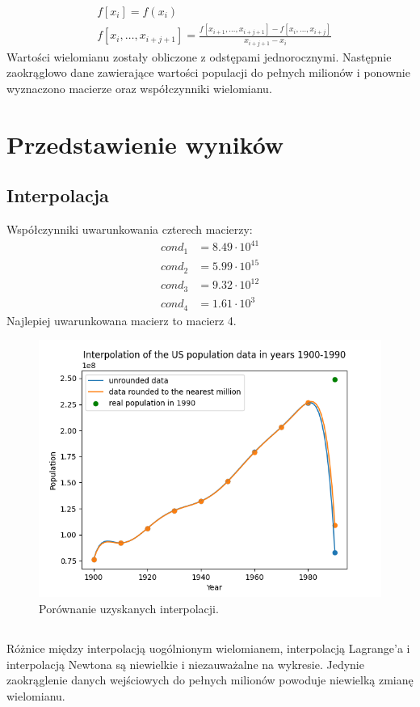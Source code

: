 \documentclass[11pt]{scrartcl}
\begin{document}
    \begin{align*}
        & f[x_i] = f(x_i) \\
        & f[x_i, \ldots ,x_{i+j+1}] =
        \frac{f[x_{i+1}, \ldots ,x_{i+j+1}]-f[x_i, \ldots ,x_{i+j}]}{x_{i+j+1}-x_i}
    \end{align*}
    Wartości wielomianu zostały obliczone z odstępami jednorocznymi. Następnie
    zaokrąglowo dane zawierające wartości populacji do pełnych milionów
    i ponownie wyznaczono macierze oraz współczynniki wielomianu.

    \section{Przedstawienie wyników}
    \subsection{Interpolacja}
    Współczynniki uwarunkowania czterech macierzy:
    \begin{align*}
        cond_1 &= 8.49 \cdot 10^{41} \\
        cond_2 &= 5.99 \cdot 10^{15} \\
        cond_3 &= 9.32 \cdot 10^{12} \\
        cond_4 &= 1.61 \cdot 10^3
    \end{align*}
    Najlepiej uwarunkowana macierz to macierz 4.

    \begin{figure}[H]
        \centering
        \includegraphics[width=0.8\linewidth]{interpolation.png}
        \caption{Porównanie uzyskanych interpolacji.}
    \end{figure}

    \subsection*{}
    Różnice między interpolacją uogólnionym wielomianem, interpolacją Lagrange'a
    i interpolacją Newtona są niewielkie i niezauważalne na wykresie. Jedynie
    zaokrąglenie danych wejściowych do pełnych milionów powoduje niewielką zmianę
    wielomianu.
\end{document}
